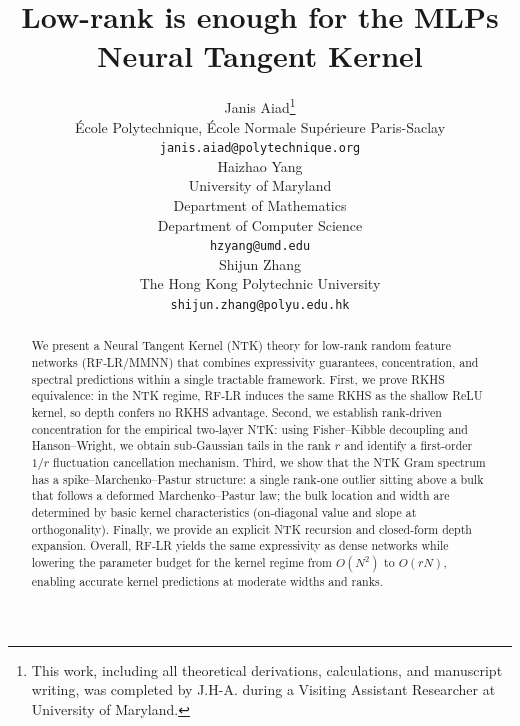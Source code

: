 \documentclass{article}
\title{Low-rank is enough for the MLPs Neural Tangent Kernel}
\author{%
  Janis Aiad\thanks{This work, including all theoretical derivations, calculations, and manuscript writing, was completed by J.H-A. during a Visiting Assistant Researcher at University of Maryland.} \\
  École Polytechnique, École Normale Supérieure Paris-Saclay \\
  \texttt{janis.aiad@polytechnique.org} \\
  \And
  Haizhao Yang \\
  University of Maryland \\
  Department of Mathematics \\
  Department of Computer Science \\
  \texttt{hzyang@umd.edu} \\
  \And
  Shijun Zhang \\
  The Hong Kong Polytechnic University \\
  \texttt{shijun.zhang@polyu.edu.hk} \\
}
\theoremstyle{definition}
\theoremstyle{plain}
\theoremstyle{remark}
\begin{document}
\maketitle

\begin{abstract}
We present a Neural Tangent Kernel (NTK) theory for low‑rank random feature networks (RF‑LR/MMNN) that combines expressivity guarantees, concentration, and spectral predictions within a single tractable framework. First, we prove RKHS equivalence: in the NTK regime, RF‑LR induces the same RKHS as the shallow ReLU kernel, so depth confers no RKHS advantage. Second, we establish rank‑driven concentration for the empirical two‑layer NTK: using Fisher–Kibble decoupling and Hanson–Wright, we obtain sub‑Gaussian tails in the rank \(r\) and identify a first‑order \(1/r\) fluctuation cancellation mechanism. Third, we show that the NTK Gram spectrum has a spike–Marchenko–Pastur structure: a single rank‑one outlier sitting above a bulk that follows a deformed Marchenko–Pastur law; the bulk location and width are determined by basic kernel characteristics (on‑diagonal value and slope at orthogonality). Finally, we provide an explicit NTK recursion and closed‑form depth expansion. Overall, RF‑LR yields the same expressivity as dense networks while lowering the parameter budget for the kernel regime from \(O(N^2)\) to \(O(rN)\), enabling accurate kernel predictions at moderate widths and ranks.
\end{abstract}

\newpage









\newpage
\begin{appendices}
\renewcommand{\thesection}{\Alph{section}}  %
\setcounter{section}{0}  %

\end{appendices}
\end{document}
